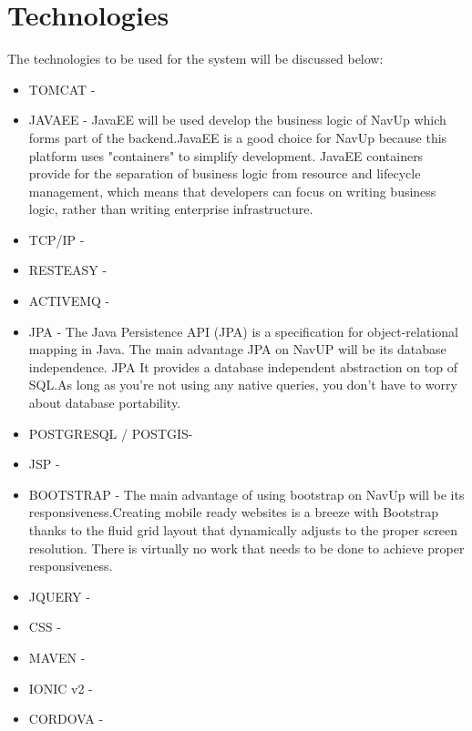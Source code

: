 
\section{Technologies}
The technologies to be used for the system will be discussed below:
\begin{itemize}
	\item TOMCAT - 
	
	\item JAVAEE - JavaEE will be used develop the business logic of NavUp which forms part of the backend.JavaEE is a good choice for NavUp because this platform uses "containers" to simplify development. JavaEE containers provide for the separation of business logic from resource and lifecycle management, which means that developers can focus on writing business logic, rather than writing enterprise infrastructure. 
	
	\item TCP/IP - 
	
	\item RESTEASY - 
	
	\item ACTIVEMQ - 
	
	\item JPA - The Java Persistence API (JPA) is a specification for object-relational mapping in Java. The main advantage JPA on NavUP will be its database independence. JPA It provides a database independent abstraction on top of SQL.As long as you’re not using any native queries, you don’t have to worry about database portability. 
	
	\item POSTGRESQL / POSTGIS- 
	
	
	
	\item JSP - 
	
	\item BOOTSTRAP - The main advantage of using bootstrap on NavUp will be its responsiveness.Creating mobile ready websites is a breeze with Bootstrap thanks to the fluid grid layout that dynamically adjusts to the proper screen resolution. There is virtually no work that needs to be done to achieve proper responsiveness.
	
	\item JQUERY - 
	
	\item CSS - 
	
	\item MAVEN - 
	
	
	
	\item IONIC v2 - 
	
	\item CORDOVA - 
	
	
	
\end{itemize}
